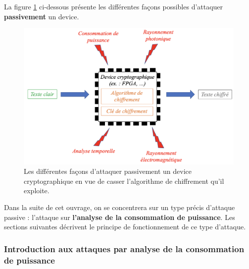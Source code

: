 \documentclass[10pt, oneside, a4paper]{article}
\begin{document}
\hspace{-0.5 cm}La figure \ref{fig:attackpassive} ci-dessous présente les différentes façons possibles d'attaquer \textbf{passivement} un device.
\begin{figure}[htbp]
    \centering
    \includegraphics[scale=0.4]{image/attackpassive}
    \caption{Les différentes façons d'attaquer passivement un device cryptographique en vue de casser l'algorithme de chiffrement qu'il exploite.}
    \label{fig:attackpassive}
\end{figure}

Dans la suite de cet ouvrage, on se concentrera sur un type précis d'attaque passive : l'attaque sur \textbf{l'analyse de la consommation de puissance}. Les sections suivantes décrivent le principe de fonctionnement de ce type d'attaque. 

\subsubsection{Introduction aux attaques par analyse de la consommation de puissance}
\label{subsec:CPAIntroduc}
\end{document}
